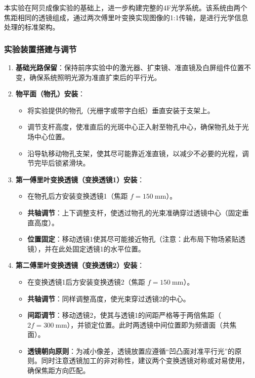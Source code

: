 \documentclass[11pt]{article}
\begin{document}
本实验在阿贝成像实验的基础上，进一步构建完整的4F光学系统。该系统由两个焦距相同的透镜组成，通过两次傅里叶变换实现图像的1:1传输，是进行光学信息处理的标准架构。

\subsubsection{实验装置搭建与调节}
\begin{enumerate}
    \item \textbf{基础光路保留}：保持前序实验中的激光器、扩束镜、准直镜及白屏组件位置不变，确保系统照明光源为准直扩束后的平行光。
    \item \textbf{物平面（物孔）安装}：
    \begin{itemize}
        \item 将实验提供的物孔（光栅字或带字白纸）垂直安装于支架上。
        \item 调节支杆高度，使准直后的光斑中心正入射至物孔中心，确保物孔处于光场中心位置。
        \item 沿导轨移动物孔支架，使其尽可能靠近准直镜，以减少不必要的光程，调节完毕后锁紧滑块。
    \end{itemize}
    \item \textbf{第一傅里叶变换透镜（变换透镜1）安装}：
    \begin{itemize}
        \item 在物孔后方安装变换透镜1（焦距 $f=150\ \text{mm}$）。
        \item \textbf{共轴调节}：上下调整支杆，使透过物孔的光束准确穿过透镜中心（固定垂直高度）。
        \item \textbf{位置固定}：移动透镜1使其尽可能接近物孔（注意：此布局下物场紧贴透镜），并在此处固定透镜1的水平位置。
    \end{itemize}
    \item \textbf{第二傅里叶变换透镜（变换透镜2）安装}：
    \begin{itemize}
        \item 在变换透镜1后方安装变换透镜2（焦距 $f=150\ \text{mm}$）。
        \item \textbf{共轴调节}：同样调整高度，使光束穿过透镜2的中心。
        \item \textbf{间距调节}：移动透镜2，使其与透镜1的间距严格等于两倍焦距（$2f = 300\ \text{mm}$），并锁定位置。此时两透镜中间位置即为频谱面（共焦面）。
        \item \textbf{透镜朝向原则}：为减小像差，透镜放置应遵循“凹凸面对准平行光”的原则。同时注意透镜加工的非对称性，建议两个变换透镜对称或对易使用，确保焦距方向匹配。
    \end{itemize}
\end{enumerate}
\end{document}
